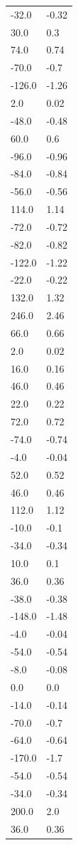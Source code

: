 \begin{longtable}{ll}
-32.0 & -0.32 \\
30.0 & 0.3 \\
74.0 & 0.74 \\
-70.0 & -0.7 \\
-126.0 & -1.26 \\
2.0 & 0.02 \\
-48.0 & -0.48 \\
60.0 & 0.6 \\
-96.0 & -0.96 \\
-84.0 & -0.84 \\
-56.0 & -0.56 \\
114.0 & 1.14 \\
-72.0 & -0.72 \\
-82.0 & -0.82 \\
-122.0 & -1.22 \\
-22.0 & -0.22 \\
132.0 & 1.32 \\
246.0 & 2.46 \\
66.0 & 0.66 \\
2.0 & 0.02 \\
16.0 & 0.16 \\
46.0 & 0.46 \\
22.0 & 0.22 \\
72.0 & 0.72 \\
-74.0 & -0.74 \\
-4.0 & -0.04 \\
52.0 & 0.52 \\
46.0 & 0.46 \\
112.0 & 1.12 \\
-10.0 & -0.1 \\
-34.0 & -0.34 \\
10.0 & 0.1 \\
36.0 & 0.36 \\
-38.0 & -0.38 \\
-148.0 & -1.48 \\
-4.0 & -0.04 \\
-54.0 & -0.54 \\
-8.0 & -0.08 \\
0.0 & 0.0 \\
-14.0 & -0.14 \\
-70.0 & -0.7 \\
-64.0 & -0.64 \\
-170.0 & -1.7 \\
-54.0 & -0.54 \\
-34.0 & -0.34 \\
200.0 & 2.0 \\
36.0 & 0.36 \\

\end{longtable}
